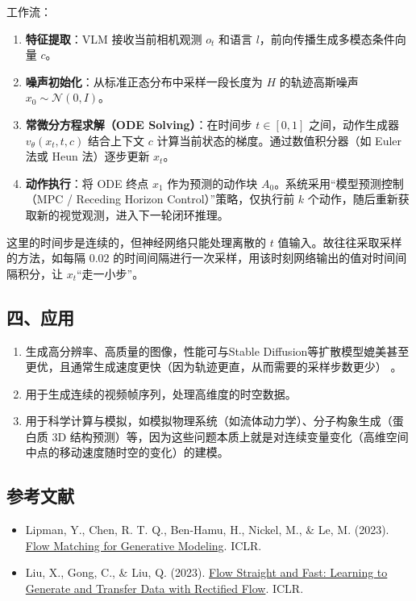 工作流：

\begin{enumerate}
\def\labelenumi{\arabic{enumi}.}
\tightlist
\item
  \textbf{特征提取}：VLM 接收当前相机观测 \(o_t\) 和语言 \(l\)，前向传播生成多模态条件向量 \(c\)。
\item
  \textbf{噪声初始化}：从标准正态分布中采样一段长度为 \(H\) 的轨迹高斯噪声 \(x_0\sim\mathcal{N}(0,I)\)。
\item
  \textbf{常微分方程求解（ODE Solving）}：在时间步 \(t\in[0,1]\) 之间，动作生成器 \(v_\theta(x_t,t,c)\) 结合上下文 \(c\) 计算当前状态的梯度。通过数值积分器（如 Euler 法或 Heun 法）逐步更新 \(x_t\)。
\item
  \textbf{动作执行}：将 ODE 终点 \(x_1\) 作为预测的动作块 \(A_0\)。系统采用``模型预测控制（MPC / Receding Horizon Control）''策略，仅执行前 \(k\) 个动作，随后重新获取新的视觉观测，进入下一轮闭环推理。
\end{enumerate}

这里的时间步是连续的，但神经网络只能处理离散的 \(t\) 值输入。故往往采取采样的方法，如每隔 \(0.02\) 的时间间隔进行一次采样，用该时刻网络输出的值对时间间隔积分，让 \(x_t\)``走一小步''。

\hypertarget{ux56dbux5e94ux7528-1}{%
\subsection{四、应用}\label{ux56dbux5e94ux7528-1}}

\begin{enumerate}
\def\labelenumi{\arabic{enumi}.}
\item
  生成高分辨率、高质量的图像，性能可与Stable Diffusion等扩散模型媲美甚至更优，且通常生成速度更快（因为轨迹更直，从而需要的采样步数更少） 。
\item
  用于生成连续的视频帧序列，处理高维度的时空数据。
\item
  用于科学计算与模拟，如模拟物理系统（如流体动力学）、分子构象生成（蛋白质 3D 结构预测）等，因为这些问题本质上就是对连续变量变化（高维空间中点的移动速度随时空的变化）的建模。
\end{enumerate}

\hypertarget{ux53c2ux8003ux6587ux732e-160}{%
\subsection{参考文献}\label{ux53c2ux8003ux6587ux732e-160}}

\begin{itemize}
\tightlist
\item
  Lipman, Y., Chen, R. T. Q., Ben-Hamu, H., Nickel, M., \& Le, M. (2023). \href{https://arxiv.org/abs/2210.02747}{Flow Matching for Generative Modeling}. ICLR.
\item
  Liu, X., Gong, C., \& Liu, Q. (2023). \href{https://arxiv.org/abs/2209.03003}{Flow Straight and Fast: Learning to Generate and Transfer Data with Rectified Flow}. ICLR.
\end{itemize}

